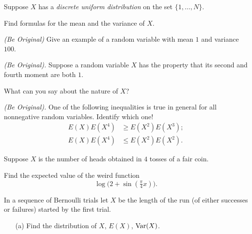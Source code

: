 \begin{problem}[Handout 7, \# 10]
  Suppose \(X\) has a \emph{discrete uniform distribution} on the set
  \(\{1,\dotsc,N\}\).

  \noindent Find formulas for the mean and the variance of \(X\).
\end{problem}
\begin{solution*}
\end{solution*}

\begin{problem}[Handout 7, \# 11]
  \emph{(Be Original)} Give an example of a random variable with mean \(1\)
  and variance \(100\).
\end{problem}
\begin{solution*}
\end{solution*}

\begin{problem}[Handout 7, \# 13]
  \emph{(Be Original).} Suppose a random variable \(X\) has the property
  that its second and fourth moment are both \(1\).

  \noindent What can you say about the nature of \(X\)?
\end{problem}
\begin{solution*}
\end{solution*}
\newpage

\begin{problem}[Handout 7, \# 14]
  \emph{(Be Original).} One of the following inequalities is true in
  general for all nonnegative random variables. Identify which one!
  \begin{align*}
    E(X)E(X^4)&\geq E(X^2)E(X^3);\\
    E(X)E(X^4)&\leq E(X^2)E(X^2).
  \end{align*}
\end{problem}
\begin{solution*}
\end{solution*}

\begin{problem}[Handout 7, \# 15]
  Suppose \(X\) is the number of heads obtained in \(4\) tosses of a fair
  coin.

  Find the expected value of the weird function
  \[
    \log\bigl( 2+\sin(\tfrac{\pi}{4}x) \bigr).
  \]
\end{problem}
\begin{solution*}
\end{solution*}

\begin{problem}[Handout 7, \# 16]
  In a sequence of Bernoulli trials let \(X\) be the length of the run (of
  either successes or failures) started by the first trial.
  \begin{itemize}[noitemsep]
  \item[(a)] Find the distribution of \(X\), \(E(X)\), \(\operatorname{Var}(X)\).
  \end{itemize}
\end{problem}
\begin{solution*}
\end{solution*}

